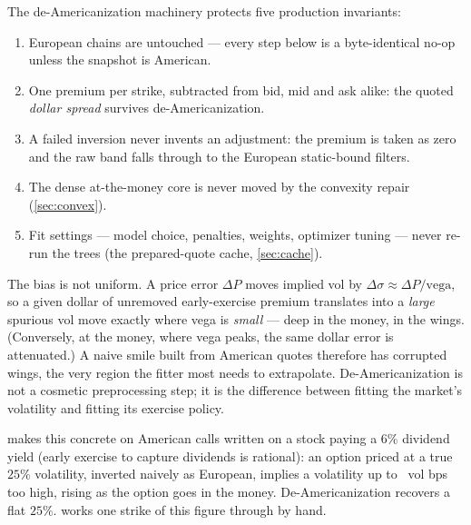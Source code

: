 \documentclass[11pt]{article}
\begin{document}
\begin{invariant}
The de-Americanization machinery protects five production invariants:
\begin{enumerate}[leftmargin=1.5em,itemsep=1pt]
\item European chains are untouched --- every step below is a byte-identical
no-op unless the snapshot is American.
\item One premium per strike, subtracted from bid, mid and ask alike: the quoted
\emph{dollar spread} survives de-Americanization.
\item A failed inversion never invents an adjustment: the premium is taken as
zero and the raw band falls through to the European static-bound filters.
\item The dense at-the-money core is never moved by the convexity repair
(\cref{sec:convex}).
\item Fit settings --- model choice, penalties, weights, optimizer tuning ---
never re-run the trees (the prepared-quote cache, \cref{sec:cache}).
\end{enumerate}
\end{invariant}

\begin{heuristic}
The bias is not uniform. A price error $\Delta P$ moves implied vol by
$\Delta\sigma\approx\Delta P/\mathrm{vega}$, so a given dollar of unremoved
early-exercise premium translates into a \emph{large} spurious vol move exactly
where vega is \emph{small} --- deep in the money, in the wings. (Conversely, at
the money, where vega peaks, the same dollar error is attenuated.) A naive smile
built from American quotes therefore has corrupted wings, the very region the
fitter most needs to extrapolate. De-Americanization is not a cosmetic
preprocessing step; it is the difference between fitting the market's volatility
and fitting its exercise policy.
\end{heuristic}

 makes this concrete on American calls written on a stock paying a
$6\%$ dividend yield (early exercise to capture dividends is rational): an option
priced at a true $25\%$ volatility, inverted naively as European, implies a
volatility up to \deammaxbias\ vol bps too high, rising as the option goes in the
money. De-Americanization recovers a flat $25\%$.  works one
strike of this figure through by hand.
\end{document}
